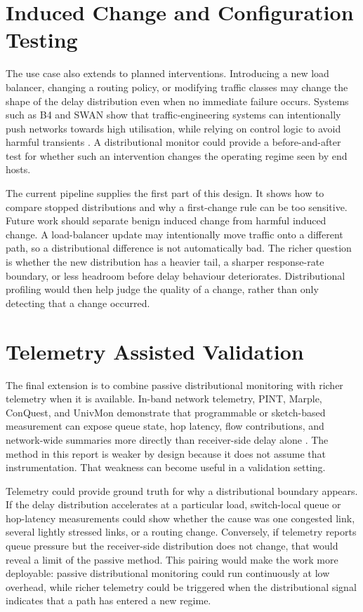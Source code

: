 \documentclass[a4paper,11pt]{report}
\begin{document}
\section{Induced Change and Configuration Testing}

The use case also extends to planned interventions. Introducing a new load balancer, changing a routing policy, or modifying traffic classes may change the shape of the delay distribution even when no immediate failure occurs. Systems such as B4 and SWAN show that traffic-engineering systems can intentionally push networks towards high utilisation, while relying on control logic to avoid harmful transients \cite{jainB4,hongSwan}. A distributional monitor could provide a before-and-after test for whether such an intervention changes the operating regime seen by end hosts.

The current pipeline supplies the first part of this design. It shows how to compare stopped distributions and why a first-change rule can be too sensitive. Future work should separate benign induced change from harmful induced change. A load-balancer update may intentionally move traffic onto a different path, so a distributional difference is not automatically bad. The richer question is whether the new distribution has a heavier tail, a sharper response-rate boundary, or less headroom before delay behaviour deteriorates. Distributional profiling would then help judge the quality of a change, rather than only detecting that a change occurred.

\section{Telemetry Assisted Validation}

The final extension is to combine passive distributional monitoring with richer telemetry when it is available. In-band network telemetry, PINT, Marple, ConQuest, and UnivMon demonstrate that programmable or sketch-based measurement can expose queue state, hop latency, flow contributions, and network-wide summaries more directly than receiver-side delay alone \cite{p4IntSpec,benBasatPint,narayanaMarple,chenConQuest,liuUnivMon}. The method in this report is weaker by design because it does not assume that instrumentation. That weakness can become useful in a validation setting.

Telemetry could provide ground truth for why a distributional boundary appears. If the delay distribution accelerates at a particular load, switch-local queue or hop-latency measurements could show whether the cause was one congested link, several lightly stressed links, or a routing change. Conversely, if telemetry reports queue pressure but the receiver-side distribution does not change, that would reveal a limit of the passive method. This pairing would make the work more deployable: passive distributional monitoring could run continuously at low overhead, while richer telemetry could be triggered when the distributional signal indicates that a path has entered a new regime.
\end{document}
